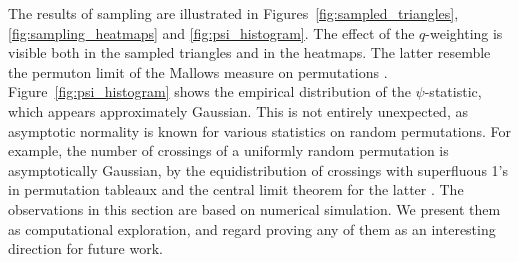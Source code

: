 \documentclass[10pt,a4paper]{amsart}
\numberwithin{equation}{section}
\theoremstyle{definition}
\begin{document}
The results of sampling are illustrated in
Figures~\ref{fig:sampled_triangles}, \ref{fig:sampling_heatmaps} and \ref{fig:psi_histogram}.
The effect of the $q$-weighting is visible both in the sampled triangles and in
the heatmaps.
The latter resemble the permuton limit of the Mallows measure on permutations
\cite{Starr2009}.
Figure~\ref{fig:psi_histogram} shows the empirical distribution of the
$\psi$-statistic, which appears approximately Gaussian.
This is not entirely unexpected, as asymptotic normality is known for various
statistics on random permutations. For example, the number of crossings of a
uniformly random permutation is asymptotically Gaussian, by the
equidistribution of crossings with superfluous 1's in permutation tableaux
\cite{Corteel2007crossings} and the central limit theorem for the latter
\cite{HitczenkoJanson2010}.
The observations in this section are based on numerical simulation. We present
them as computational exploration, and regard proving any of them as an
interesting direction for future work.
\end{document}
